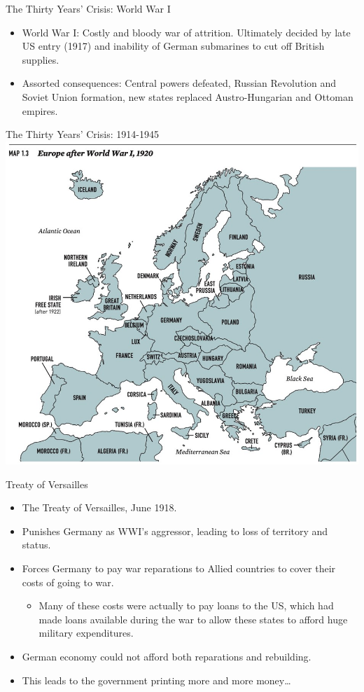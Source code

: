 \documentclass{beamer}
\begin{document}
\begin{frame}{\LARGE The Thirty Years' Crisis: World War I}
	\begin{itemize}
		\item World War I: Costly and bloody war of attrition. Ultimately decided by late US entry (1917) and inability of German submarines to cut off British supplies.
		\item Assorted consequences: Central powers defeated, Russian Revolution and Soviet Union formation, new states replaced Austro-Hungarian and Ottoman empires.
	\end{itemize}
\end{frame}

\begin{frame}{\LARGE The Thirty Years' Crisis: 1914-1945}
	\centering
\includegraphics[width=\textwidth,height=.9\textheight,keepaspectratio]{Europe1920.jpg}
\end{frame}

\begin{frame}{\LARGE Treaty of Versailles}
	\begin{itemize}
		\item The Treaty of Versailles, June 1918.
		\item Punishes Germany as WWI's aggressor, leading to loss of territory and status.
		\item Forces Germany to pay war reparations to Allied countries to cover their costs of going to war.
		\begin{itemize}
			\item Many of these costs were actually to pay loans to the US, which had made loans available during the war to allow these states to afford huge military expenditures.
		\end{itemize}
		\item German economy could not afford both reparations and rebuilding.
		\item This leads to the government printing more and more money…		
	\end{itemize}
\end{frame}
\end{document}
